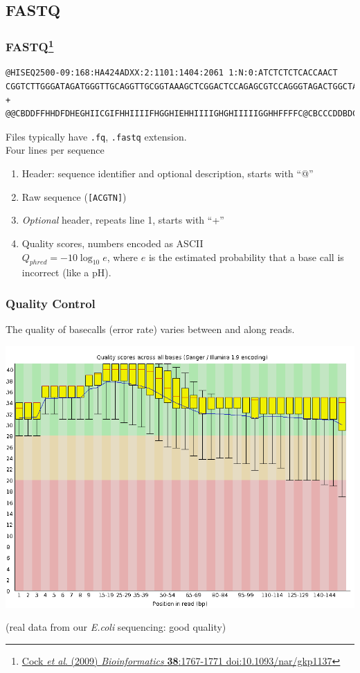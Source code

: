 \subsection{FASTQ}

\begin{frame}[fragile]
  \frametitle{FASTQ\footnote{\tiny{\href{http://dx.doi.org/10.1093/nar/gkp1137}{Cock \textit{et al}. (2009) \textit{Bioinformatics} \textbf{38}:1767-1771 doi:10.1093/nar/gkp1137}}}}
\begin{verbatim}
@HISEQ2500-09:168:HA424ADXX:2:1101:1404:2061 1:N:0:ATCTCTCTCACCAACT
CGGTCTTGGGATAGATGGGTTGCAGGTTGCGGTAAAGCTCGGACTCCAGAGCGTCCAGGGTAGACTGGCTAATCTTCTGCTCTTTATCGATCATTATTTC
+
@@CBDDFFHHDFDHEGHIICGIFHHIIIIFHGGHIEHHIIIIGHGHIIIIIGGHHFFFFC@CBCCCDDBDCDDDDDDDDCCDDDD3@ABDDDDDEEEDE@
\end{verbatim}
  Files typically have \texttt{.fq}, \texttt{.fastq} extension. \\
  Four lines per sequence
  \begin{enumerate}
    \item Header: sequence identifier and optional description, starts with ``@''
    \item Raw sequence (\texttt{[ACGTN]})
    \item \textit{Optional} header, repeats line 1, starts with ``+''
    \item Quality scores, numbers encoded as ASCII\\
             $Q_{phred} = -10 \log_{10}e$, where $e$ is the estimated probability that a base call is incorrect (like a pH).
  \end{enumerate}
\end{frame}


\begin{frame}[fragile]
  \frametitle{Quality Control}
  The quality of basecalls (error rate) varies between and along reads.\\
  \begin{center}
    \includegraphics[height=0.6\textheight]{images/per_base_quality}
  \end{center}  
  (real data from our \textit{E.coli} sequencing: good quality)
\end{frame}

